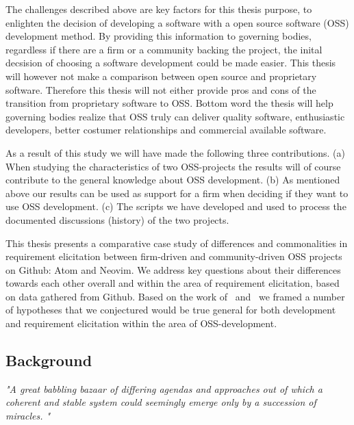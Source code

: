 \documentclass[a4paper,11pt]{article}
\begin{document}
{%
The challenges described above are key factors for this thesis purpose, to enlighten the decision of developing a software with a open source software (OSS) development method. By providing this information to governing bodies, regardless if there are a firm or a community backing the project, the inital decsision of choosing a software development could be made easier. This thesis will however not make a comparison between open source and proprietary software. Therefore this thesis will not either provide pros and cons of the transition from proprietary software to OSS. Bottom word the thesis will help governing bodies realize that OSS truly can deliver quality software, enthusiastic developers, better costumer relationships and commercial available software.

As a result of this study we will have made the following three contributions. (a) When studying the characteristics of two OSS-projects the results will of course contribute to the general knowledge about OSS development. (b) As mentioned above our results can be used as support for a firm when deciding if they want to use OSS development. (c) The scripts we have developed and used to process the documented discussions (history) of the two projects.

This thesis presents a comparative case study of differences and commonalities in requirement elicitation between firm-driven and community-driven OSS projects on Github: Atom and Neovim. We address key questions about their differences towards each other overall and within the area of requirement elicitation, based on data gathered from Github. Based on the work of~\cite{Mockus2002a} and~\cite{Noll} we framed a number of hypotheses that we conjectured would be true general for both development and requirement elicitation within the area of OSS-development.

\subsection{Background}

\begin{displayquote}
	\textit{"A great babbling bazaar of differing agendas and approaches out of which a coherent and stable system could seemingly emerge only by a succession of miracles. "}~\cite{catb}
\end{displayquote}

}
\end{document}
